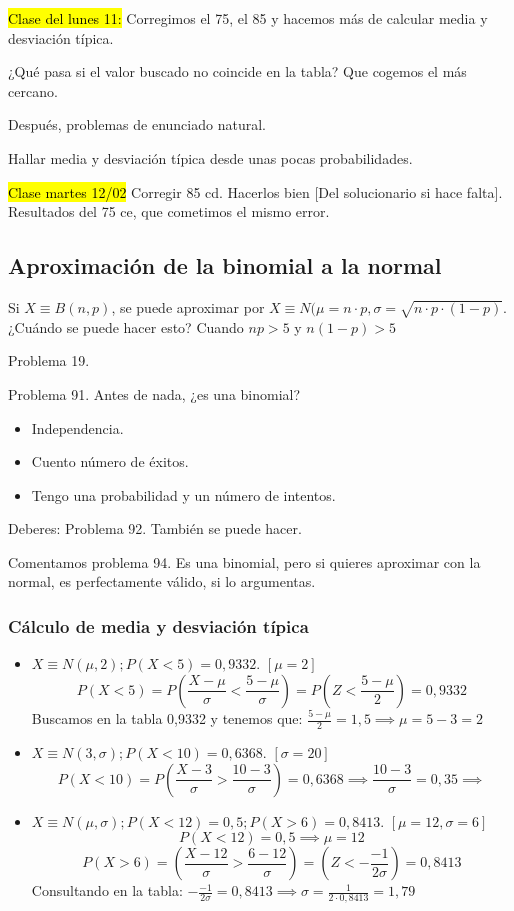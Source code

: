\hl{Clase del lunes 11: } Corregimos el 75, el 85 y hacemos más de calcular media y desviación típica.

¿Qué pasa si el valor buscado no coincide en la tabla? Que cogemos el más cercano.

Después, problemas de enunciado natural.

Hallar media y desviación típica desde unas pocas probabilidades.

\hl{Clase martes 12/02}
Corregir 85 cd. Hacerlos bien [Del solucionario si hace falta].
Resultados del 75 ce, que cometimos el mismo error.


\subsection{Aproximación de la binomial a la normal}

Si $X\equiv B(n,p)$, se puede aproximar por $X\equiv N(\mu=n·p, \sigma=\sqrt{n·p·(1-p)}$. ¿Cuándo se puede hacer esto? Cuando $np>5$ y $n(1-p)>5$

Problema 19.

Problema 91. Antes de nada, ¿es una binomial? 
\begin{itemize}
	\item Independencia.
	\item Cuento número de éxitos.
	\item Tengo una probabilidad y un número de intentos.
\end{itemize}

Deberes: Problema 92. También se puede hacer.

Comentamos problema 94. Es una binomial, pero si quieres aproximar con la normal, es perfectamente válido, si lo argumentas.

\subsubsection{Cálculo de media y desviación típica}

\begin{itemize}
	\item $X\equiv N(\mu,2); P(X<5) = 0,9332$. $[\mu = 2]$
	\[
	P\left(X<5\right) = P\left(\frac{X-\mu}{\sigma}<\frac{5-\mu}{\sigma}\right) = P\left(Z<\frac{5-\mu}{2}\right) = 0,9332
	\]
	Buscamos en la tabla 0,9332 y tenemos que:
	$\frac{5-\mu}{2} = 1,5 \implies \mu=5-3=2$
	\item $X\equiv N(3,\sigma); P(X<10) = 0,6368$. $[\sigma = 20]$
	\[
		P\left(X<10\right) = P\left(\frac{X-3}{\sigma}>\frac{10-3}{\sigma}\right) =0,6368 \implies \frac{10-3}{\sigma}=0,35 \implies 
	\]
	\item $X\equiv N(\mu,\sigma); P(X<12) = 0,5; P(X>6) = 0,8413$. $[\mu = 12, \sigma = 6]$
	\[
		P(X<12) = 0,5 \implies \mu = 12
	\]
	\[
		P\left(X>6\right) = \left(\frac{X-12}{\sigma}>\frac{6-12}{\sigma}\right) = \left(Z<-\frac{-1}{2\sigma}\right) = 0,8413
	\]
	Consultando en la tabla: $-\frac{-1}{2\sigma} = 0,8413 \implies \sigma = \frac{1}{2·0,8413} = 1,79$
\end{itemize}